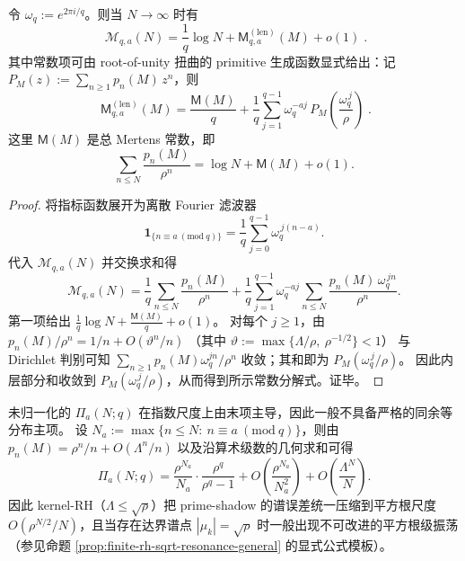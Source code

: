 \begin{theorem}\label{thm:zeta-length-modq-chebotarev-mertens}
令 \(\omega_q:=e^{2\pi i/q}\)。则当 \(N\to\infty\) 时有
\[
\boxed{\;
\mathcal{M}_{q,a}(N)=\frac{1}{q}\log N+\mathsf{M}^{(\mathrm{len})}_{q,a}(M)+o(1)\; }.
\]
其中常数项可由 root-of-unity 扭曲的 primitive 生成函数显式给出：记
\(
P_M(z):=\sum_{n\ge1}p_n(M)\,z^n
\)，则
\[
\boxed{\;
\mathsf{M}^{(\mathrm{len})}_{q,a}(M)
=\frac{\mathsf{M}(M)}{q}
+\frac{1}{q}\sum_{j=1}^{q-1}\omega_q^{-aj}\,P_M\!\left(\frac{\omega_q^{\,j}}{\rho}\right)\; }.
\]
这里 \(\mathsf{M}(M)\) 是总 Mertens 常数，即
\[
\sum_{n\le N}\frac{p_n(M)}{\rho^n}=\log N+\mathsf{M}(M)+o(1).
\]
\end{theorem}
\begin{proof}
将指标函数展开为离散 Fourier 滤波器
\[
\mathbf 1_{\{n\equiv a\ (\mathrm{mod}\ q)\}}
=\frac{1}{q}\sum_{j=0}^{q-1}\omega_q^{\,j(n-a)}.
\]
代入 \(\mathcal{M}_{q,a}(N)\) 并交换求和得
\[
\mathcal{M}_{q,a}(N)
=\frac{1}{q}\sum_{n\le N}\frac{p_n(M)}{\rho^n}
+\frac{1}{q}\sum_{j=1}^{q-1}\omega_q^{-aj}\sum_{n\le N}\frac{p_n(M)\,\omega_q^{\,jn}}{\rho^n}.
\]
第一项给出 \(\frac{1}{q}\log N+\frac{\mathsf{M}(M)}{q}+o(1)\)。
对每个 \(j\ge1\)，由
\(
p_n(M)/\rho^n
=1/n+O(\vartheta^n/n)
\)
（其中 \(\vartheta:=\max\{\Lambda/\rho,\ \rho^{-1/2}\}<1\)）
与 Dirichlet 判别可知 \(\sum_{n\ge1}p_n(M)\omega_q^{jn}/\rho^n\) 收敛；其和即为 \(P_M(\omega_q^{\,j}/\rho)\)。
因此内层部分和收敛到 \(P_M(\omega_q^{\,j}/\rho)\)，从而得到所示常数分解式。证毕。
\end{proof}

\begin{remark}\label{rem:zeta-length-modq-raw-endpoint-bias}
未归一化的 \(\Pi_a(N;q)\) 在指数尺度上由末项主导，因此一般不具备严格的同余等分布主项。
设 \(N_a:=\max\{n\le N:\ n\equiv a\ (\mathrm{mod}\ q)\}\)，则由
\(
p_n(M)=\rho^n/n+O(\Lambda^n/n)
\)
以及沿算术级数的几何求和可得
\[
\Pi_a(N;q)
=\frac{\rho^{N_a}}{N_a}\cdot\frac{\rho^q}{\rho^q-1}
+O\!\left(\frac{\rho^{N_a}}{N_a^2}\right)
+O\!\left(\frac{\Lambda^{N}}{N}\right).
\]
因此 kernel-RH（\(\Lambda\le \sqrt{\rho}\)）把 prime-shadow 的谱误差统一压缩到平方根尺度 \(O(\rho^{N/2}/N)\)，且当存在达界谱点 \(|\mu_k|=\sqrt{\rho}\) 时一般出现不可改进的平方根级振荡（参见命题 \ref{prop:finite-rh-sqrt-resonance-general} 的显式公式模板）。
\end{remark}

